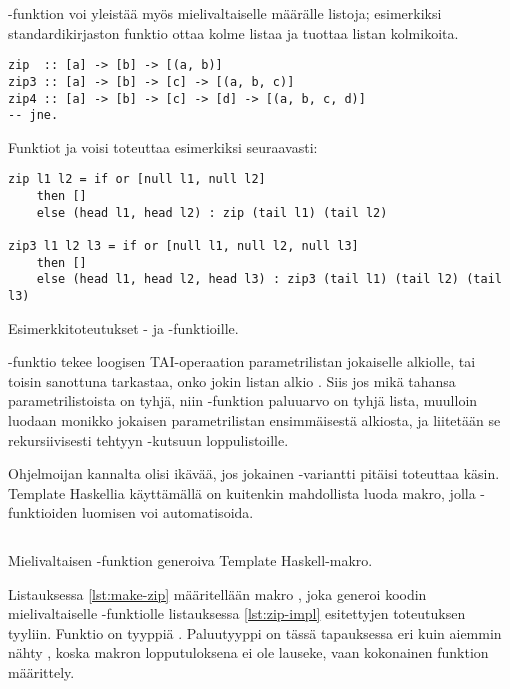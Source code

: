 -funktion voi yleistää myös mielivaltaiselle määrälle listoja;
esimerkiksi standardikirjaston funktio  ottaa kolme listaa ja tuottaa listan kolmikoita.

\begin{verbatim}
zip  :: [a] -> [b] -> [(a, b)]
zip3 :: [a] -> [b] -> [c] -> [(a, b, c)]
zip4 :: [a] -> [b] -> [c] -> [d] -> [(a, b, c, d)]
-- jne.
\end{verbatim}

Funktiot  ja  voisi toteuttaa esimerkiksi seuraavasti:

\begin{listing}[H]
\begin{verbatim}
zip l1 l2 = if or [null l1, null l2]
    then []
    else (head l1, head l2) : zip (tail l1) (tail l2)

zip3 l1 l2 l3 = if or [null l1, null l2, null l3]
    then []
    else (head l1, head l2, head l3) : zip3 (tail l1) (tail l2) (tail l3)
\end{verbatim}
\label{lst:zip-impl}
\caption{Esimerkkitoteutukset - ja -funktioille.}
\end{listing}

-funktio  tekee loogisen TAI-operaation parametrilistan
jokaiselle alkiolle,
tai toisin sanottuna tarkastaa, onko jokin listan alkio .
Siis jos mikä tahansa parametrilistoista on tyhjä, niin -funktion paluuarvo on tyhjä lista,
muulloin luodaan monikko jokaisen parametrilistan ensimmäisestä alkiosta,
ja liitetään se rekursiivisesti tehtyyn -kutsuun loppulistoille.

Ohjelmoijan kannalta olisi ikävää, jos jokainen -variantti pitäisi toteuttaa käsin.
Template Haskellia käyttämällä on kuitenkin mahdollista luoda makro,
jolla -funktioiden luomisen voi automatisoida.

\begin{listing}[H]
    \inputminted{haskell}{codes/zip-generator/MakeZip.hs}
    \label{lst:make-zip}
    \caption{Mielivaltaisen -funktion generoiva Template Haskell-makro.}
\end{listing}

Listauksessa \ref{lst:make-zip} määritellään makro ,
joka generoi koodin mielivaltaiselle -funktiolle listauksessa \ref{lst:zip-impl}
esitettyjen toteutuksen tyyliin.
Funktio  on tyyppiä .
Paluutyyppi on tässä tapauksessa eri kuin aiemmin nähty ,
koska makron lopputuloksena ei ole lauseke,
vaan kokonainen funktion määrittely.

